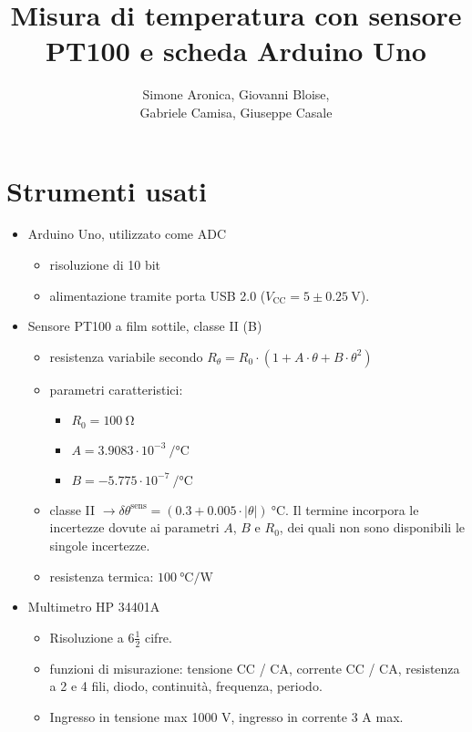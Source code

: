 \documentclass{article}
\title{Misura di temperatura con
sensore PT100 e
scheda Arduino Uno}
\author{Simone Aronica, Giovanni Bloise, \\
Gabriele Camisa, Giuseppe Casale}
\begin{document}
\maketitle
\tableofcontents
\pagebreak

\section{Strumenti usati}
\begin{itemize}
    \item Arduino Uno, utilizzato come ADC 
    \begin{itemize}
        \item risoluzione di 10 bit 
        \item alimentazione tramite porta USB 2.0 ($V_{\text{CC}} = 5 \pm \SI{0.25}{\volt}$).
    \end{itemize}
    \item Sensore PT100 a film sottile, classe II (B) 
    \begin{itemize}
        \item resistenza variabile secondo $R_{\theta}=R_0\cdot\left(1+A\cdot\theta+B\cdot\theta^2\right)$
        \item parametri caratteristici:
        \begin{itemize}
            \item $R_0=\SI{100}{\ohm}$
            \item $A=3.9083\cdot10^{-3}\SI{}{\per\celsius}$
            \item $B=-5.775\cdot10^{-7}\SI{}{\per\celsius}$
        \end{itemize}
    \item classe II $\rightarrow \delta\theta^\text{sens}=(0.3+0.005\cdot|\theta|)\SI{}{\celsius}$. Il termine incorpora le incertezze dovute ai parametri $A$, $B$ e $R_0$, dei quali non sono disponibili le singole incertezze.
    \item resistenza termica: $\SI{100}{\celsius\per\watt}$
    \end{itemize}
    \item Multimetro HP 34401A
    \begin{itemize}
        \item Risoluzione a 6$\frac{1}{2}$ cifre.
        \item funzioni di misurazione: tensione CC / CA, corrente CC / CA, resistenza a 2 e 4 fili, diodo, continuità, frequenza, periodo.
        \item Ingresso in tensione max 1000 V, ingresso in corrente 3 A max.
    \end{itemize}
\end{itemize}
\end{document}

